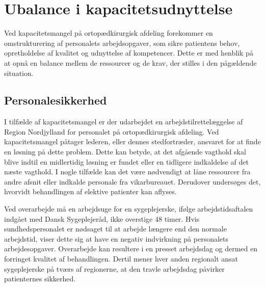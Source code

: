 \section{Ubalance i kapacitetsudnyttelse}
Ved kapacitetsmangel på ortopædkirurgisk afdeling forekommer en omstrukturering af personalets arbejdsopgaver, som sikre patientens behov, opretholdelse af kvalitet og udnyttelse af kompetencer. Dette er med henblik på at opnå en balance mellem de ressourcer og de krav, der stilles i den pågældende situation.\cite{Bjerg2016}  %

\subsection{Personalesikkerhed} \label{Per_sik}

I tilfælde af kapacitetsmangel er der udarbejdet en arbejdstilrettelæggelse af Region Nordjylland for personalet på ortopædkirurgisk afdeling. Ved kapacitetsmangel påtager lederen, eller dennes stedfortræder, ansvaret for at finde en løsning på dette problem. Dette kan betyde, at det afgående vagthold skal blive indtil en midlertidig løsning er fundet eller en tidligere indkaldelse af det næste vagthold. I nogle tilfælde kan det være nødvendigt at låne ressourcer fra andre afsnit eller indkalde personale fra vikarbureauet. Derudover undersøges det, hvorvidt behandlingen af elektive patienter kan aflyses.\cite{Bjerg2016} 

Ved overarbejde må en arbejdsuge for en sygeplejerske, ifølge arbejdstidsaftalen indgået med Dansk Sygeplejeråd, ikke overstige 48 timer\cite{Danske2015}.  Hvis sundhedspersonalet er nødsaget til at arbejde længere end den normale arbejdstid, viser dette sig at have en negativ indvirkning på personalets arbejdesopgaver\cite{Dinges2004}. Overarbejde kan resultere i en presset arbejdsdag og dermed en forringet kvalitet af behandlingen\cite{Kjeldsen2015}. Dertil mener hver anden regionalt ansat sygeplejerske på tværs af regionerne, at den travle arbejdsdag påvirker patienternes sikkerhed\cite{Kjeldsen2015}.



